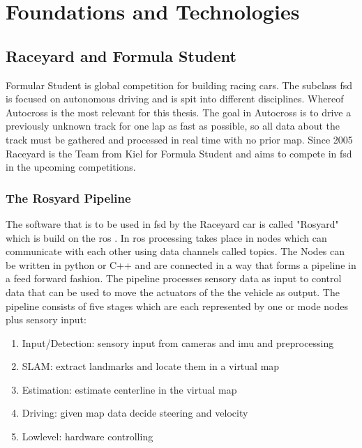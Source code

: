 

\graphicspath{{Chapter/Figs/FoundationsAndTechnologies/}}
\chapter{Foundations and Technologies}

\section{Raceyard and Formula Student}
Formular Student is global competition for building racing cars. The subclass \ac{fsd} is focused on autonomous driving and is spit into different disciplines. Whereof Autocross is the most relevant for this thesis. The goal in Autocross is to drive a previously unknown track for one lap as fast as possible, so all data about the track must be gathered and processed in real time with no prior map.
Since 2005 Raceyard is the Team from Kiel for Formula Student and aims to compete in \ac{fsd} in the upcoming competitions.


\subsection{The Rosyard Pipeline}
The software that is to be used in \ac{fsd} by the Raceyard car is called "Rosyard" which is build on the \ac{ros} \cite{ros}.
In \ac{ros} processing takes place in nodes which can communicate with each other using data channels called topics. The Nodes can be written in python or C++ and are connected in a way that forms a pipeline in a feed forward fashion. The pipeline processes sensory data as input to control data that can be used to move the actuators of the the vehicle as output. The pipeline consists of five stages which are each represented by one or mode nodes plus sensory input:
\begin{enumerate}
    \item Input/Detection: sensory input from cameras and \ac{imu} and preprocessing
    \item SLAM: extract landmarks and locate them in a virtual map
    \item Estimation: estimate centerline in the virtual map
    \item Driving: given map data decide steering and velocity
    \item Lowlevel: hardware controlling
\end{enumerate}

